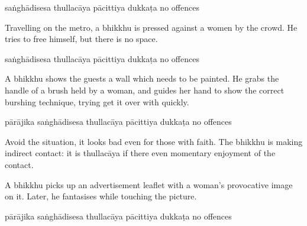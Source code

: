 \begin{exam}{\autoExamName}
\begin{problem*}
\begin{parts}
    \bigskip

    \begin{answers}{5}
      \bChoices
       saṅghādisesa\eAns
       thullacāya\eAns
       pācittiya\eAns
       dukkaṭa\eAns
       no offences\eAns
      \eChoices
    \end{answers}

    \bigskip

  \item Travelling on the metro, a bhikkhu is pressed against a women by the
    crowd. He tries to free himself, but there is no space.

    \bigskip

    \begin{answers}{5}
      \bChoices
       saṅghādisesa\eAns
       thullacāya\eAns
       pācittiya\eAns
       dukkaṭa\eAns
       no offences\eAns
      \eChoices
    \end{answers}

    \bigskip

  \item A bhikkhu shows the guests a wall which needs to be painted. He grabs the
  handle of a brush held by a woman, and guides her hand to show the correct
  burshing technique, trying get it over with quickly.

  \bigskip

  \begin{answers}{6}
    \bChoices
     pārājika\eAns
     saṅghādisesa\eAns
     thullacāya\eAns
     pācittiya\eAns
     dukkaṭa\eAns
     no offences\eAns
    \eChoices
  \end{answers}

  \begin{solution}
    Avoid the situation, it looks bad even for those with faith. The bhikkhu is
    making indirect contact: it is thullacāya if there even momentary enjoyment
    of the contact.
  \end{solution}

  \bigskip

  \item A bhikkhu picks up an advertisement leaflet with a woman's provocative
    image on it. Later, he fantasises while touching the picture.

  \bigskip

  \begin{answers}{6}
    \bChoices
     pārājika\eAns
     saṅghādisesa\eAns
     thullacāya\eAns
     pācittiya\eAns
     dukkaṭa\eAns
     no offences\eAns
    \eChoices
  \end{answers}


\end{parts}
\end{problem*}
\end{exam}

